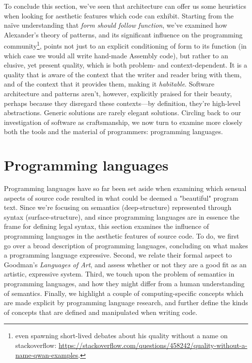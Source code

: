 \documentclass{article}
\begin{document}
To conclude this section, we've seen that architecture can offer us some heuristics when looking for aesthetic features which code can exhibit. Starting from the naïve understanding that \emph{form should follow function}, we've examined how Alexander's theory of patterns, and its significant influence on the programming community\footnote{even spawning short-lived debates about his quality without a name on stackoverflow: \url{https://stackoverflow.com/questions/458242/quality-without-a-name-qwan-examples}.}, points not just to an explicit conditioning of form to its function (in which case we would all write hand-made Assembly code), but rather to an elusive, yet present quality, which is both problem- and context-dependent. It is a quality that is aware of the context that the writer and reader bring with them, and of the context that it provides them, making it \emph{habitable}. Software architecture and patterns aren't, however, explicitly praised for their beauty, perhaps because they disregard these contexts—by definition, they're high-level abstractions. Generic solutions are rarely elegant solutions. Circling back to our investigation of software as craftsmanship, we now turn to examine more closely both the tools and the material of programmers: programming languages.

\pagebreak

\section{Programming languages}

Programming languages have so far been set aside when examining which sensual aspects of source code resulted in what could be deemed a "beautiful" program text. Since we're focusing on semantics (deep-structure) represented through syntax (surface-structure), and since programming languages are in essence the frame for defining legal syntax, this section examines the influence of programming languages in the aesthetic features of source code. To do, we first go over a broad description of programming languages, concluding on what makes a programming language expressive. Second, we relate their formal aspect to Goodman's \emph{Languages of Art}, and assess whether or not they are a good fit as an artistic, expressive system. Third, we touch upon the problem of semantics in programming languages, and how they might differ from a human understanding of semantics. Finally, we highlight a couple of computing-specific concepts which are made explicit by programming language research, and further define the kinds of concepts that are defined and manipulated when writing code.
\end{document}
